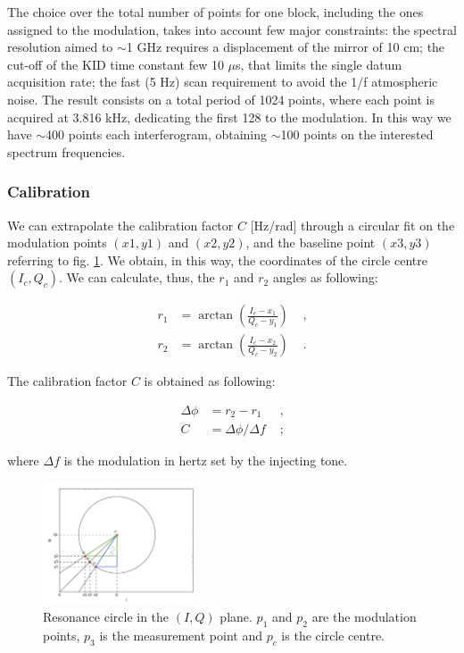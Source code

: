 \documentclass[twocolumn,traditabstract]{aa}\\
\begin{document}
\noindent The choice over the total number of points for one block, including the ones assigned to the modulation, takes into account few major constraints: the spectral resolution aimed to $\sim$1 GHz requires a displacement of the mirror of 10 cm; the cut-off of the KID time constant few 10 $\mu$s, that limits the single datum acquisition rate; the fast (5 Hz) scan requirement to avoid the 1/f atmospheric noise. The result consists on a total period of 1024 points, where each point is acquired at 3.816 kHz, dedicating the first 128 to the modulation. In this way we have $\sim$400 points each interferogram, obtaining $\sim$100 points on the interested spectrum frequencies.

\subsubsection{Calibration}
\label{calib}

\noindent We can extrapolate the calibration factor $C$ [Hz/rad] through a circular fit on the modulation points $(x1,y1)$ and $(x2,y2)$, and the baseline point $(x3,y3)$ referring to fig. \ref{fig:IQ_modulation}. We obtain, in this way, the coordinates of the circle centre $(I_c,Q_c)$. We can calculate, thus, the $r_1$ and $r_2$ angles as following:

\begin{equation}
\begin{align}
r_1 &= \arctan\left( \frac{I_c-x_1}{Q_c - y_1}  \right) &\text{ ,}\\
r_2 &= \arctan\left( \frac{I_c-x_2}{Q_c - y_2}  \right) &\text{ .}
\end{align}
\end{equation}

\noindent The calibration factor $C$ is obtained as following:

\begin{equation}
\begin{align}
\Delta \phi &= r_2-r_1 &\text{ ,}\\
C&=\Delta\phi/\Delta f &\text{ ;}
\end{align}
\end{equation}

\noindent where $\Delta f$ is the modulation in hertz set by the injecting tone. 

\begin{figure}[htf]
	\centering
	\includegraphics[width=0.4\textwidth]{3.acqui/circle.png}
	\caption{Resonance circle in the $(I,Q)$ plane. $p_1$ and $p_2$ are the modulation points, $p_3$ is the measurement point and $p_c$ is the circle centre. }
	\label{fig:IQ_modulation}
\end{figure}
\end{document}
